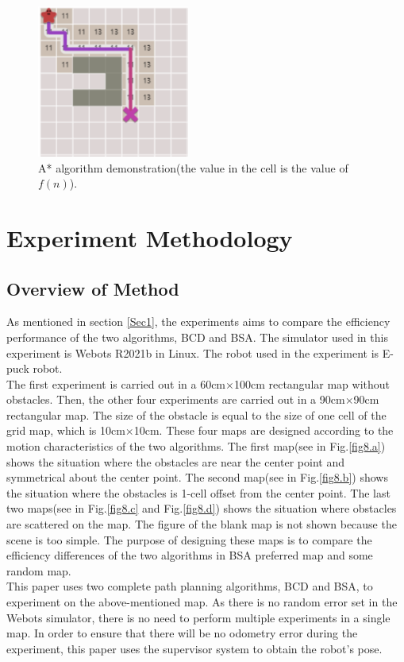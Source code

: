\documentclass[conference]{IEEEtran}
\begin{document}
\setlength{\belowcaptionskip}{-1cm}
\begin{figure}[htbp]
\centerline{\includegraphics[width=5cm,height=5cm]{RS_Report/astar.png}}
\caption{A* algorithm demonstration(the value in the cell is the value of $f(n)$).}
\label{fig4}
\end{figure}



\section{Experiment Methodology}

\subsection{Overview of Method}
As mentioned in section \ref{Sec1}, the experiments aims to compare the efficiency performance of the two algorithms, BCD and BSA. The simulator used in this experiment is Webots R2021b in Linux. The robot used in the experiment is E-puck robot\cite{Cyberboticswebsite}.\\
The first experiment is carried out in a 60cm$\times$100cm rectangular map without obstacles. Then, the other four experiments are carried out in a 90cm$\times$90cm rectangular map. The size of the obstacle is equal to the size of one cell of the grid map, which is 10cm$\times$10cm. These four maps are designed according to the motion characteristics of the two algorithms. The first map(see in Fig.\ref{fig8.a}) shows the situation where the obstacles are near the center point and symmetrical about the center point. The second map(see in Fig.\ref{fig8.b}) shows the situation where the obstacles is 1-cell offset from the center point. The last two maps(see in Fig.\ref{fig8.c} and Fig.\ref{fig8.d}) shows the situation where obstacles are scattered on the map. The figure of the blank map is not shown because the scene is too simple. The purpose of designing these maps is to compare the efficiency differences of the two algorithms in BSA preferred map and some random map.\\
This paper uses two complete path planning algorithms, BCD and BSA, to experiment on the above-mentioned map. As there is no random error set in the Webots simulator, there is no need to perform multiple experiments in a single map. In order to ensure that there will be no odometry error during the experiment, this paper uses the supervisor system to obtain the robot's pose. 
\end{document}
